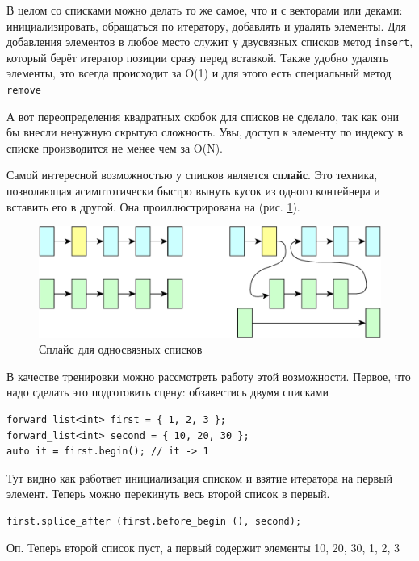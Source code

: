\documentclass[a4paper,12pt,oneside]{book}
\begin{document}
В целом со списками можно делать то же самое, что и с векторами или деками: инициализировать, обращаться по итератору, добавлять и удалять элементы. Для добавления элементов в любое место служит у двусвязных списков метод \lstinline!insert!, который берёт итератор позиции сразу перед вставкой. Также удобно удалять элементы, это всегда происходит за O(1) и для этого есть специальный метод \lstinline!remove!

А вот переопределения квадратных скобок для списков не сделало, так как они бы внесли ненужную скрытую сложность. Увы, доступ к элементу по индексу в списке производится не менее чем за O(N).

Самой интересной возможностью у списков является \textbf{сплайс}. Это техника, позволяющая асимптотически быстро вынуть кусок из одного контейнера и вставить его в другой. Она проиллюстрирована на (рис. \ref{fig:list_splice}).

\begin{figure}[h!]
\centering
\includegraphics[width=1.0\textwidth]{illustrations/list-splice-crop.pdf}
\caption{Сплайс для односвязных списков}
\label{fig:list_splice}
\end{figure}

В качестве тренировки можно рассмотреть работу этой возможности. Первое, что надо сделать это подготовить сцену: обзавестись двумя списками

\begin{lstlisting}
forward_list<int> first = { 1, 2, 3 }; 
forward_list<int> second = { 10, 20, 30 }; 
auto it = first.begin(); // it -> 1
\end{lstlisting}

Тут видно как работает инициализация списком и взятие итератора на первый элемент. Теперь можно перекинуть весь второй список в первый. 

\begin{lstlisting}
first.splice_after (first.before_begin (), second);
\end{lstlisting}

Оп. Теперь второй список пуст, а первый содержит элементы 10, 20, 30, 1, 2, 3
\end{document}
